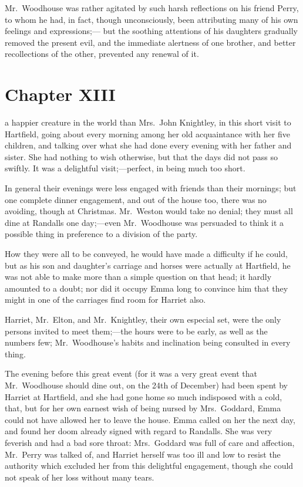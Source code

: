 Mr.\ Woodhouse was rather agitated by such harsh reflections on
his friend Perry, to whom he had, in fact, though unconsciously,
been attributing many of his own feelings and expressions;---%
but the soothing attentions of his daughters gradually removed
the present evil, and the immediate alertness of one brother,
and better recollections of the other, prevented any renewal of it.



\chapter{Chapter XIII}


 a happier creature in the world than Mrs.\ John
Knightley, in this short visit to Hartfield, going about every morning
among her old acquaintance with her five children, and talking
over what she had done every evening with her father and sister.
She had nothing to wish otherwise, but that the days did not pass
so swiftly.  It was a delightful visit;---perfect, in being much too short.

In general their evenings were less engaged with friends than
their mornings; but one complete dinner engagement, and out
of the house too, there was no avoiding, though at Christmas.
Mr.\ Weston would take no denial; they must all dine at Randalls
one day;---even Mr.\ Woodhouse was persuaded to think it a possible
thing in preference to a division of the party.

How they were all to be conveyed, he would have made a difficulty
if he could, but as his son and daughter's carriage and horses
were actually at Hartfield, he was not able to make more than
a simple question on that head; it hardly amounted to a doubt;
nor did it occupy Emma long to convince him that they might in one
of the carriages find room for Harriet also.

Harriet, Mr.\ Elton, and Mr.\ Knightley, their own especial set,
were the only persons invited to meet them;---the hours were to be early,
as well as the numbers few; Mr.\ Woodhouse's habits and inclination
being consulted in every thing.

The evening before this great event (for it was a very great event
that Mr.\ Woodhouse should dine out, on the 24th of December) had been
spent by Harriet at Hartfield, and she had gone home so much indisposed
with a cold, that, but for her own earnest wish of being nursed
by Mrs.\ Goddard, Emma could not have allowed her to leave the house.
Emma called on her the next day, and found her doom already signed
with regard to Randalls.  She was very feverish and had a bad
sore throat:  Mrs.\ Goddard was full of care and affection, Mr.\ Perry
was talked of, and Harriet herself was too ill and low to resist
the authority which excluded her from this delightful engagement,
though she could not speak of her loss without many tears.

